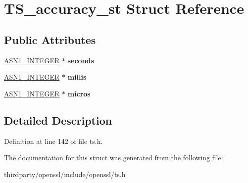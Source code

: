 \hypertarget{struct_t_s__accuracy__st}{}\section{T\+S\+\_\+accuracy\+\_\+st Struct Reference}
\label{struct_t_s__accuracy__st}
\subsection*{Public Attributes}
\begin{DoxyCompactItemize}
\item 
\mbox{\label{struct_t_s__accuracy__st_a50d21da03ece4bf6c78f3fa96ffaae15}} 
\hyperlink{structasn1__string__st}{A\+S\+N1\+\_\+\+I\+N\+T\+E\+G\+ER} $\ast$ {\bfseries seconds}
\item 
\mbox{\label{struct_t_s__accuracy__st_a617d05085e9ab508437929ab86b6f4a3}} 
\hyperlink{structasn1__string__st}{A\+S\+N1\+\_\+\+I\+N\+T\+E\+G\+ER} $\ast$ {\bfseries millis}
\item 
\mbox{\label{struct_t_s__accuracy__st_af1acda98f117fef39f799581bf37bb38}} 
\hyperlink{structasn1__string__st}{A\+S\+N1\+\_\+\+I\+N\+T\+E\+G\+ER} $\ast$ {\bfseries micros}
\end{DoxyCompactItemize}


\subsection{Detailed Description}


Definition at line 142 of file ts.\+h.



The documentation for this struct was generated from the following file\+:\begin{DoxyCompactItemize}
\item 
thirdparty/openssl/include/openssl/ts.\+h\end{DoxyCompactItemize}
